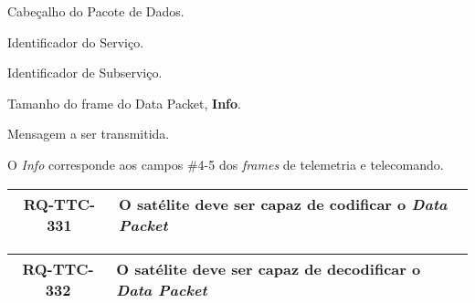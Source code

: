 \begin{description}[align=right]
    \item[Header] Cabeçalho do Pacote de Dados.
    \item[Code] Identificador do Serviço.
    \item[SubCode] Identificador de Subserviço.
    \item[Length] Tamanho do frame do Data Packet, \textbf{Info}.
    \item[Info] Mensagem a ser transmitida.
\end{description}

O \textit{Info} corresponde aos campos \#4-5 dos \textit{frames} de telemetria e telecomando.

\begin{table}[H]
    \centering
    \begin{tabular}{|c|p{}|}
        \hline
        \rowcolor{orange}
        \textbf{RQ-TTC-331} & \textbf{O satélite deve ser capaz de codificar o \textit{Data Packet}} \\ \hline
    \end{tabular}
    \label{tab:rq-ttc-331}
\end{table}

\begin{table}[H]
    \centering
    \begin{tabular}{|c|p{}|}
        \hline
        \rowcolor{orange}
        \textbf{RQ-TTC-332} & \textbf{O satélite deve ser capaz de decodificar o \textit{Data Packet}} \\ \hline
    \end{tabular}
    \label{tab:rq-ttc-332}
\end{table}